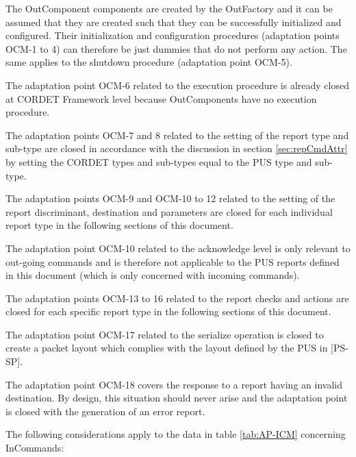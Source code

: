 \documentclass[a4paper,10pt]{article}
\newenvironment{fw_itemize}						%
{\begin{itemize}
  \setlength{\itemsep}{1mm}
  \setlength{\parskip}{0pt}
  \setlength{\parsep}{0pt}}
{\end{itemize}}
\begin{document}
\begin{fw_itemize}
\item The OutComponent components are created by the OutFactory and it can be assumed that they are created such that they can be successfully initialized and configured. Their initialization and configuration procedures (adaptation points OCM-1 to 4) can therefore be just dummies that do not perform any action. The same applies to the shutdown procedure (adaptation point OCM-5).
\item The adaptation point OCM-6 related to the execution procedure is already closed at CORDET Framework level because OutComponents have no execution procedure.
\item The adaptation points OCM-7 and 8 related to the setting of the report type and sub-type are closed in accordance with the discussion in section \ref{sec:repCmdAttr} by setting the CORDET types and sub-types equal to the PUS type and sub-type.
\item The adaptation points OCM-9 and OCM-10 to 12 related to the setting of the report discriminant, destination and parameters are closed for each individual report type in the following sections of this document.
\item The adaptation point OCM-10 related to the acknowledge level is only relevant to out-going commands and is therefore not applicable to the PUS reports defined in this document (which is only concerned with incoming commands).
\item The adaptation points OCM-13 to 16 related to the report checks and actions are closed for each specific report type in the following sections of this document.
\item The adaptation point OCM-17 related to the serialize operation is closed to create a packet layout which complies with the layout defined by the PUS in [PS-SP].
\item The adaptation point OCM-18 covers the response to a report having an invalid destination. By design, this situation should never arise and the adaptation point is closed with the generation of an error report.
\end{fw_itemize}

The following considerations apply to the data in table \ref{tab:AP-ICM} concerning InCommands:
\end{document}
